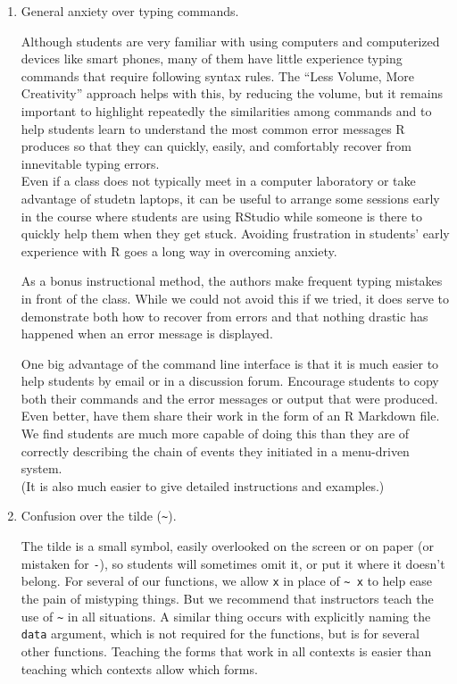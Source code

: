 \begin{enumerate}
\def\labelenumi{\arabic{enumi}.}
\item
  General anxiety over typing commands.

  Although students are very familiar with using computers and
  computerized devices like smart phones, many of them have little
  experience typing commands that require following syntax rules. The
  ``Less Volume, More Creativity'' approach helps with this, by reducing
  the volume, but it remains important to highlight repeatedly the
  similarities among commands and to help students learn to understand
  the most common error messages R produces so that they can quickly,
  easily, and comfortably recover from innevitable typing errors.\\
  Even if a class does not typically meet in a computer laboratory or
  take advantage of studetn laptops, it can be useful to arrange some
  sessions early in the course where students are using RStudio while
  someone is there to quickly help them when they get stuck. Avoiding
  frustration in students' early experience with R goes a long way in
  overcoming anxiety.

  As a bonus instructional method, the authors make frequent typing
  mistakes in front of the class. While we could not avoid this if we
  tried, it does serve to demonstrate both how to recover from errors
  and that nothing drastic has happened when an error message is
  displayed.

  One big advantage of the command line interface is that it is much
  easier to help students by email or in a discussion forum. Encourage
  students to copy both their commands and the error messages or output
  that were produced.\\
  Even better, have them share their work in the form of an R Markdown
  file. We find students are much more capable of doing this than they
  are of correctly describing the chain of events they initiated in a
  menu-driven system.\\
  (It is also much easier to give detailed instructions and examples.)
\item
  Confusion over the tilde (\texttt{\textasciitilde{}}).

  The tilde is a small symbol, easily overlooked on the screen or on
  paper (or mistaken for \texttt{-}), so students will sometimes omit
  it, or put it where it doesn't belong. For several of our functions,
  we allow \texttt{x} in place of \texttt{\textasciitilde{}\ x} to help
  ease the pain of mistyping things. But we recommend that instructors
  teach the use of \texttt{\textasciitilde{}} in all situations. A
  similar thing occurs with explicitly naming the \texttt{data}
  argument, which is not required for the  functions, but
  is for several other functions. Teaching the forms that work in all
  contexts is easier than teaching which contexts allow which forms.


\end{enumerate}
